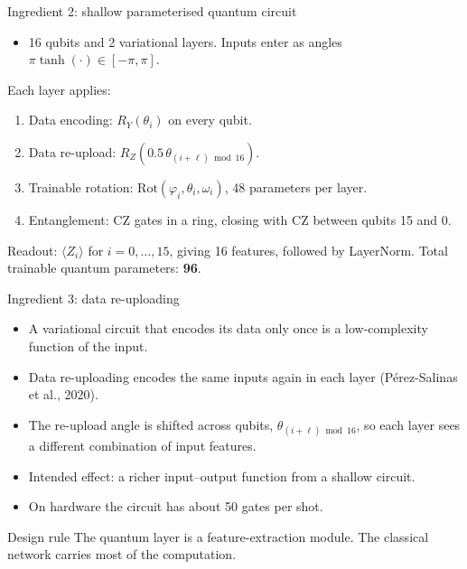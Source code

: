\documentclass[aspectratio=169]{beamer}
\begin{document}
\begin{frame}{Ingredient 2: shallow parameterised quantum circuit}
\begin{itemize}
  \item 16 qubits and 2 variational layers. Inputs enter as angles $\pi\tanh(\cdot) \in [-\pi,\pi]$.
\end{itemize}
\vspace{0.1cm}
Each layer applies:
\begin{enumerate}
  \item Data encoding: $R_Y(\theta_i)$ on every qubit.
  \item Data re-upload: $R_Z(0.5\,\theta_{(i+\ell)\bmod 16})$.
  \item Trainable rotation: $\mathrm{Rot}(\varphi_i,\theta_i,\omega_i)$, 48 parameters per layer.
  \item Entanglement: CZ gates in a ring, closing with CZ between qubits 15 and 0.
\end{enumerate}
\vspace{0.1cm}
Readout: $\langle Z_i \rangle$ for $i=0,\dots,15$, giving 16 features, followed by LayerNorm. Total trainable quantum parameters: \textbf{96}.
\end{frame}

\begin{frame}{Ingredient 3: data re-uploading}
\begin{itemize}
  \item A variational circuit that encodes its data only once is a low-complexity function of the input.
  \item Data re-uploading encodes the same inputs again in each layer (P\'erez-Salinas et al., 2020).
  \item The re-upload angle is shifted across qubits, $\theta_{(i+\ell)\bmod 16}$, so each layer sees a different combination of input features.
  \item Intended effect: a richer input--output function from a shallow circuit.
  \item On hardware the circuit has about 50 gates per shot.
\end{itemize}
\vspace{0.3cm}
\begin{block}{Design rule}
The quantum layer is a feature-extraction module. The classical network carries most of the computation.
\end{block}
\end{frame}
\end{document}
